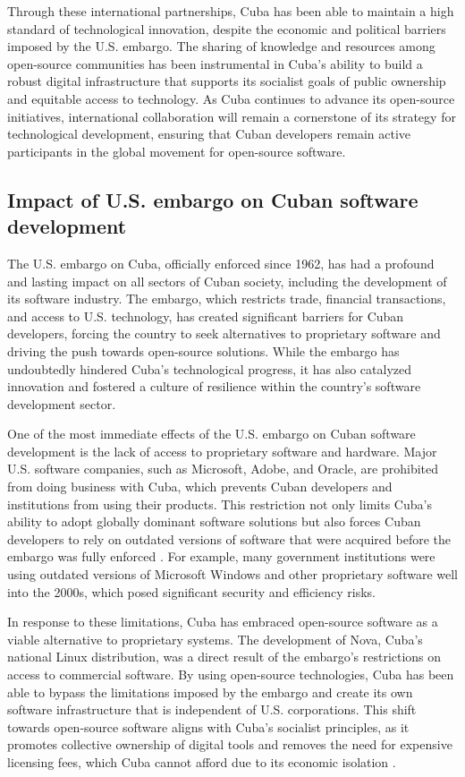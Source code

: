 \begin{refsection}
Through these international partnerships, Cuba has been able to maintain a high standard of technological innovation, despite the economic and political barriers imposed by the U.S. embargo. The sharing of knowledge and resources among open-source communities has been instrumental in Cuba’s ability to build a robust digital infrastructure that supports its socialist goals of public ownership and equitable access to technology. As Cuba continues to advance its open-source initiatives, international collaboration will remain a cornerstone of its strategy for technological development, ensuring that Cuban developers remain active participants in the global movement for open-source software.

\subsection{Impact of U.S. embargo on Cuban software development}

The U.S. embargo on Cuba, officially enforced since 1962, has had a profound and lasting impact on all sectors of Cuban society, including the development of its software industry. The embargo, which restricts trade, financial transactions, and access to U.S. technology, has created significant barriers for Cuban developers, forcing the country to seek alternatives to proprietary software and driving the push towards open-source solutions. While the embargo has undoubtedly hindered Cuba’s technological progress, it has also catalyzed innovation and fostered a culture of resilience within the country’s software development sector.

One of the most immediate effects of the U.S. embargo on Cuban software development is the lack of access to proprietary software and hardware. Major U.S. software companies, such as Microsoft, Adobe, and Oracle, are prohibited from doing business with Cuba, which prevents Cuban developers and institutions from using their products. This restriction not only limits Cuba’s ability to adopt globally dominant software solutions but also forces Cuban developers to rely on outdated versions of software that were acquired before the embargo was fully enforced \cite[pp.~90-110]{kapcia}. For example, many government institutions were using outdated versions of Microsoft Windows and other proprietary software well into the 2000s, which posed significant security and efficiency risks.

In response to these limitations, Cuba has embraced open-source software as a viable alternative to proprietary systems. The development of Nova, Cuba’s national Linux distribution, was a direct result of the embargo’s restrictions on access to commercial software. By using open-source technologies, Cuba has been able to bypass the limitations imposed by the embargo and create its own software infrastructure that is independent of U.S. corporations. This shift towards open-source software aligns with Cuba’s socialist principles, as it promotes collective ownership of digital tools and removes the need for expensive licensing fees, which Cuba cannot afford due to its economic isolation \cite[pp.~56-87]{feinberg}.


\end{refsection}
